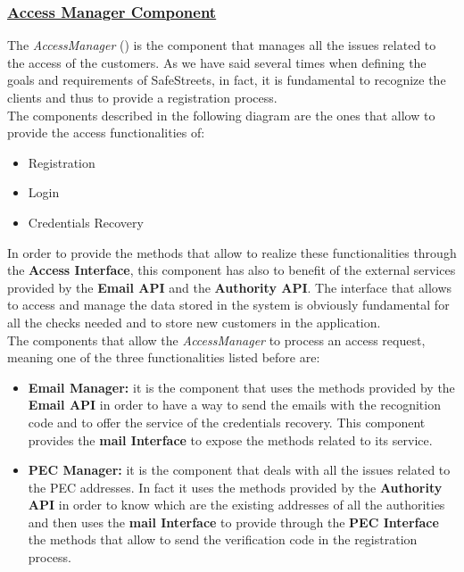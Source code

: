 		\subsubsection[Access Manager Component]{\hyperlink{toc}{Access Manager Component}}
			\label{sec:accessManagerComponent}
			
			The \emph{AccessManager} () is the component that manages all the issues related to the access of the customers. As we have said several times when defining the goals and requirements of SafeStreets, in fact, it is fundamental to recognize the clients and thus to provide a registration process.\\
			
			The components described in the following diagram are the ones that allow to provide the access functionalities of:
			
			\begin{itemize}
				\item Registration
				\item Login
				\item Credentials Recovery
			\end{itemize}
		
			In order to provide the methods that allow to realize these functionalities through the \textbf{Access Interface}, this component has also to benefit of the external services provided by the \textbf{Email API} and the \textbf{Authority API}. The interface that allows to access and manage the data stored in the system is obviously fundamental for all the checks needed and to store new customers in the application.\\
			
			The components that allow the \emph{AccessManager} to process an access request, meaning one of the three functionalities listed before are:
			
			\begin{itemize}
				\item \textbf{Email Manager:} it is the component that uses the methods provided by the \textbf{Email API} in order to have a way to send the emails with the recognition code and to offer the service of the credentials recovery. This component provides the \textbf{mail Interface} to expose the methods related to its service.
			
				\item \textbf{PEC Manager:} it is the component that deals with all the issues related to the PEC addresses. In fact it uses the methods provided by the \textbf{Authority API} in order to know which are the existing addresses of all the authorities and then uses the \textbf{mail Interface} to provide through the \textbf{PEC Interface} the methods that allow to send the verification code in the registration process.
			\end{itemize}
			
